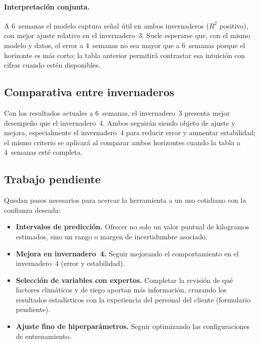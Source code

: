 \documentclass[11pt,a4paper]{article}
\begin{document}
\paragraph{Interpretación conjunta.} A 6~semanas el modelo captura señal útil en ambos invernaderos ($R^{2}$ positivo), con mejor ajuste relativo en el invernadero~3. Suele esperarse que, con el mismo modelo y datos, el error a 4~semanas no sea mayor que a 6~semanas porque el horizonte es más corto; la tabla anterior permitirá contrastar esa intuición con cifras cuando estén disponibles.


\subsection{Comparativa entre invernaderos}

Con los resultados actuales a 6~semanas, el invernadero~3 presenta mejor desempeño que el invernadero~4. Ambos seguirán siendo objeto de ajuste y mejora, especialmente el invernadero~4 para reducir error y aumentar estabilidad; el mismo criterio se aplicará al comparar ambos horizontes cuando la tabla a 4~semanas esté completa.

\subsection{Trabajo pendiente}\label{sec:pendiente}

\begin{infobox}
Quedan pasos necesarios para acercar la herramienta a un uso cotidiano con la confianza deseada:
\begin{itemize}
  \item \textbf{Intervalos de predicción.} Ofrecer no solo un valor puntual de kilogramos estimados, sino un rango o margen de incertidumbre asociado.
  \item \textbf{Mejora en invernadero~4.} Seguir mejorando el comportamiento en el invernadero~4 (error y estabilidad).
  \item \textbf{Selección de variables con expertos.} Completar la revisión de qué factores climáticos y de riego aportan más información, cruzando los resultados estadísticos con la experiencia del personal del cliente (formulario pendiente).
  \item \textbf{Ajuste fino de hiperparámetros.} Seguir optimizando las configuraciones de entrenamiento.
\end{itemize}
\end{infobox}
\end{document}
